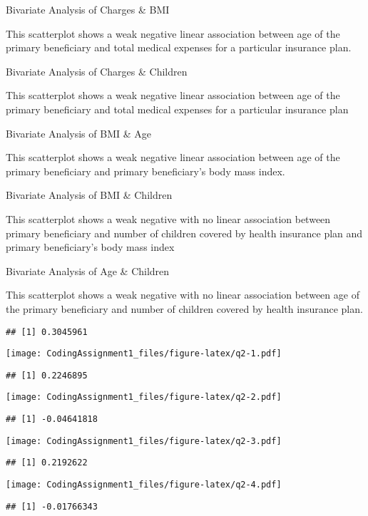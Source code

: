 \documentclass[
]{article}
\begin{document}
Bivariate Analysis of Charges \& BMI

This scatterplot shows a weak negative linear association between age of
the primary beneficiary and total medical expenses for a particular
insurance plan.

Bivariate Analysis of Charges \& Children

This scatterplot shows a weak negative linear association between age of
the primary beneficiary and total medical expenses for a particular
insurance plan

Bivariate Analysis of BMI \& Age

This scatterplot shows a weak negative linear association between age of
the primary beneficiary and primary beneficiary's body mass index.

Bivariate Analysis of BMI \& Children

This scatterplot shows a weak negative with no linear association
between primary beneficiary and number of children covered by health
insurance plan and primary beneficiary's body mass index

Bivariate Analysis of Age \& Children

This scatterplot shows a weak negative with no linear association
between age of the primary beneficiary and number of children covered by
health insurance plan.

\begin{verbatim}
## [1] 0.3045961
\end{verbatim}

\texttt{[image: CodingAssignment1\_files/figure-latex/q2-1.pdf]}

\begin{verbatim}
## [1] 0.2246895
\end{verbatim}

\texttt{[image: CodingAssignment1\_files/figure-latex/q2-2.pdf]}

\begin{verbatim}
## [1] -0.04641818
\end{verbatim}

\texttt{[image: CodingAssignment1\_files/figure-latex/q2-3.pdf]}

\begin{verbatim}
## [1] 0.2192622
\end{verbatim}

\texttt{[image: CodingAssignment1\_files/figure-latex/q2-4.pdf]}

\begin{verbatim}
## [1] -0.01766343
\end{verbatim}
\end{document}
